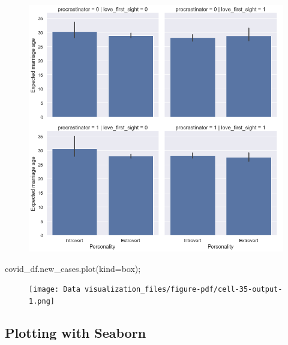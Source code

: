 \documentclass[
  letterpaper,
  DIV=11,
  numbers=noendperiod]{scrreprt}
\newenvironment{Shaded}{\begin{snugshade}}{\end{snugshade}}
\newcommand{\NormalTok}[1]{\textcolor[rgb]{0.00,0.23,0.31}{#1}}
\newcommand{\OperatorTok}[1]{\textcolor[rgb]{0.37,0.37,0.37}{#1}}
\newcommand{\StringTok}[1]{\textcolor[rgb]{0.13,0.47,0.30}{#1}}
\begin{document}
\begin{figure}[H]

{\centering \includegraphics{Data visualization_files/figure-pdf/cell-34-output-1.png}

}

\end{figure}

\begin{Shaded}
\begin{Highlighting}[]
\NormalTok{covid\_df.new\_cases.plot(kind}\OperatorTok{=}\StringTok{\textquotesingle{}box\textquotesingle{}}\NormalTok{)}\OperatorTok{;}
\end{Highlighting}
\end{Shaded}

\begin{figure}[H]

{\centering \texttt{[image: Data visualization\_files/figure-pdf/cell-35-output-1.png]}

}

\end{figure}

\hypertarget{plotting-with-seaborn}{%
\subsection{Plotting with Seaborn}\label{plotting-with-seaborn}}
\end{document}
